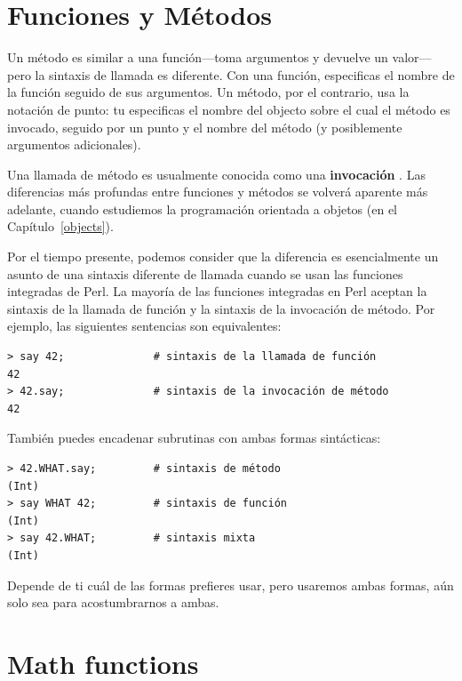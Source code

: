 \section{Funciones y Métodos}

Un método es similar a una función---toma argumentos y 
devuelve un valor---pero la sintaxis de llamada es
diferente. Con una función, especificas el nombre de la función
seguido de sus argumentos. Un método, por el contrario, usa 
la notación de punto: tu especificas el nombre del objecto
sobre el cual el método es invocado, seguido por un punto y
el nombre del método (y posiblemente argumentos adicionales).

% 
Una llamada de método es usualmente conocida como una 
{\bf invocación} . Las diferencias más
profundas entre funciones y métodos se volverá aparente 
más adelante, cuando estudiemos la programación orientada
a objetos (en el Capítulo~\ref{objects}).

Por el tiempo presente, podemos consider que la diferencia
es esencialmente un asunto de una sintaxis diferente de 
llamada cuando se usan las funciones integradas de Perl. La mayoría
de las funciones integradas en Perl aceptan la sintaxis de la llamada
de función y la sintaxis de la invocación de método. Por ejemplo,
las siguientes sentencias son equivalentes:

\begin{verbatim}
> say 42;              # sintaxis de la llamada de función
42
> 42.say;              # sintaxis de la invocación de método
42
\end{verbatim}
%

También puedes encadenar subrutinas con ambas formas
sintácticas:

\begin{verbatim}
> 42.WHAT.say;         # sintaxis de método
(Int)
> say WHAT 42;         # sintaxis de función
(Int)
> say 42.WHAT;         # sintaxis mixta
(Int)
\end{verbatim}
%

Depende de ti cuál de las formas prefieres usar, pero
usaremos ambas formas, aún solo sea para acostumbrarnos
a ambas.

\section{Math functions}

